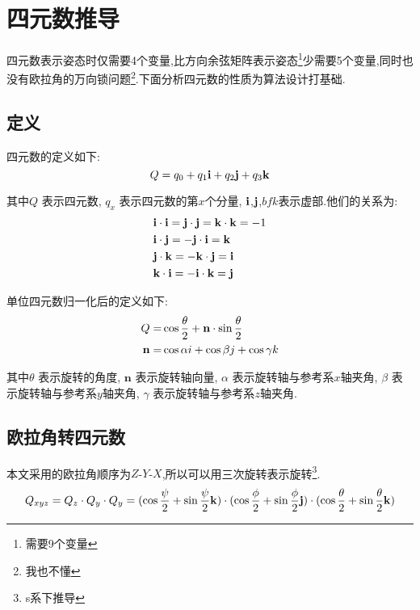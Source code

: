 
\section{四元数推导}
四元数表示姿态时仅需要4个变量,比方向余弦矩阵表示姿态\footnote{需要9个变量}少需要5个变量,同时也没有欧拉角的万向锁问题\footnote{我也不懂}.下面分析四元数的性质为算法设计打基础.

\subsection{定义}
四元数的定义如下:
\begin{equation}\label{四元数定义}
    Q = q_0 + q_1\mathbf{i} + q_2\mathbf{j} + q_3\mathbf{k}
\end{equation} 

其中$Q$     表示四元数,
$q_x$       表示四元数的第$x$个分量,
$\mathbf{i}$,$\mathbf{j}$,$bfk$表示虚部.他们的关系为:
\begin{equation}\label{四元数虚部关系}
    \begin{split}
        & \mathbf{i} \cdot \mathbf{i} =  \mathbf{j} \cdot \mathbf{j} = \mathbf{k} \cdot \mathbf{k} = -1 \\
        & \mathbf{i} \cdot \mathbf{j} = -\mathbf{j} \cdot \mathbf{i} = \mathbf{k} \\
        & \mathbf{j} \cdot \mathbf{k} = -\mathbf{k} \cdot \mathbf{j} = \mathbf{i} \\
        & \mathbf{k} \cdot \mathbf{i} = -\mathbf{i} \cdot \mathbf{k} = \mathbf{j}
    \end{split}
\end{equation} 

单位四元数{归一化后}的定义如下:
\begin{equation}\label{四元数归一化定义}
    \begin{split}
        Q = & \cos\frac{\theta}{2} + \mathbf{n} \cdot \sin\frac{\theta}{2} \\
        \mathbf{n} = & \cos{\alpha}i + \cos{\beta}j + \cos{\gamma}k
    \end{split}
\end{equation} 

其中$\theta$    表示旋转的角度,
$\mathbf{n}$       表示旋转轴向量,
$\alpha$        表示旋转轴与参考系$x$轴夹角,
$\beta$         表示旋转轴与参考系$y$轴夹角,
$\gamma$        表示旋转轴与参考系$z$轴夹角.

\subsection{欧拉角转四元数}
本文采用的欧拉角顺序为$Z$-$Y$-$X$,所以可以用三次旋转表示\cite{飞行器专题资料}旋转\footnote{s系下推导}.
\begin{equation}\label{四元数三次旋转}
    Q_{xyz} = Q_z \cdot Q_y \cdot Q_y = (\cos\frac{\psi}{2} + \sin\frac{\psi}{2} \mathbf{k}) \cdot (\cos\frac{\phi}{2} + \sin\frac{\phi}{2} \mathbf{j}) \cdot (\cos\frac{\theta}{2} + \sin\frac{\theta}{2} \mathbf{k})
\end{equation} 

